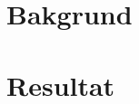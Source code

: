 \documentclass[
  utf8,%
  parskip,%
  largesmallcaps,intlimits,widermath,%
  sharecounter,nobreak,definition=marks,%
  parts%
]{rtthesis}
\begin{document}
\makeFrontPage
\frontmatter
\maketitle
\makeLibraryPage{}

\begin{abstract}[swedish]
  
\end{abstract}
\begin{abstract}[english]
  
\end{abstract}

\tableofcontents


\mainmatter
\part{Bakgrund}


\part[Resultat]{Resultat\thispagestyle{plain}}%



\appendix



\backmatter



\printindex
\end{document}

